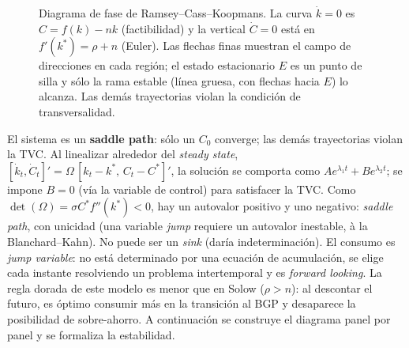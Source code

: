 \documentclass[11pt]{article}
\theoremstyle{definition}
\begin{document}
\begin{figure}[h]
\centering
{}
\caption{Diagrama de fase de Ramsey--Cass--Koopmans. La curva $\dot{k}=0$ es $C=f(k)-nk$
(factibilidad) y la vertical $\dot{C}=0$ está en $f'(k^{\ast})=\rho+n$ (Euler). Las flechas finas
muestran el campo de direcciones en cada región; el estado estacionario $E$ es un punto de silla y sólo
la rama estable (línea gruesa, con flechas hacia $E$) lo alcanza. Las demás trayectorias violan la
condición de transversalidad.}
\end{figure}

El sistema es un \textbf{saddle path}: sólo un $C_{0}$ converge; las demás trayectorias violan la
TVC. Al linealizar alrededor del \emph{steady state},
$[\dot{k}_{t},\dot{C}_{t}]'=\Omega\,[k_{t}-k^{\ast},\,C_{t}-C^{\ast}]'$, la solución se comporta como
$A e^{\lambda_{1}t}+B e^{\lambda_{2}t}$; se impone $B=0$ (vía la variable de control) para satisfacer
la TVC. Como $\det(\Omega)=\sigma C^{\ast}f''(k^{\ast})<0$, hay un autovalor positivo y uno negativo:
\emph{saddle path}, con unicidad (una variable \emph{jump} requiere un autovalor inestable, à la
Blanchard--Kahn). No puede ser un \emph{sink} (daría indeterminación). El consumo es \emph{jump
variable}: no está determinado por una ecuación de acumulación, se elige cada instante resolviendo un
problema intertemporal y es \emph{forward looking}. La regla dorada de este modelo es menor que en
Solow ($\rho>n$): al descontar el futuro, es óptimo consumir más en la transición al BGP y desaparece
la posibilidad de sobre-ahorro. A continuación se construye el diagrama panel por panel y se formaliza la estabilidad.
\end{document}
